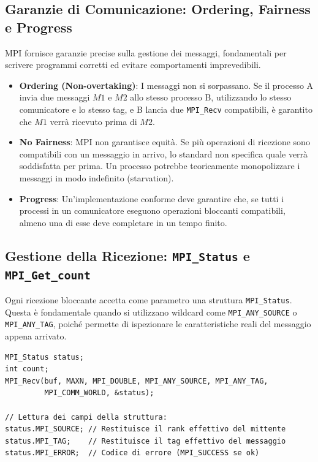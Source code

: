 \subsection{Garanzie di Comunicazione: Ordering, Fairness e Progress}
MPI fornisce garanzie precise sulla gestione dei messaggi, fondamentali per scrivere programmi corretti ed evitare comportamenti imprevedibili.

\begin{itemize}
    \item \textbf{Ordering (Non-overtaking)}: I messaggi non si sorpassano. Se il processo A invia due messaggi $M1$ e $M2$ allo stesso processo B, utilizzando lo stesso comunicatore e lo stesso tag, e B lancia due \texttt{MPI\_Recv} compatibili, è garantito che $M1$ verrà ricevuto prima di $M2$.
    \item \textbf{No Fairness}: MPI non garantisce equità. Se più operazioni di ricezione sono compatibili con un messaggio in arrivo, lo standard non specifica quale verrà soddisfatta per prima. Un processo potrebbe teoricamente monopolizzare i messaggi in modo indefinito (starvation).
    \item \textbf{Progress}: Un'implementazione conforme deve garantire che, se tutti i processi in un comunicatore eseguono operazioni bloccanti compatibili, almeno una di esse deve completare in un tempo finito.
\end{itemize}

\subsection{Gestione della Ricezione: \texttt{MPI\_Status} e \texttt{MPI\_Get\_count}}
Ogni ricezione bloccante accetta come parametro una struttura \texttt{MPI\_Status}. Questa è fondamentale quando si utilizzano wildcard come \texttt{MPI\_ANY\_SOURCE} o \texttt{MPI\_ANY\_TAG}, poiché permette di ispezionare le caratteristiche reali del messaggio appena arrivato.

\begin{verbatim}
MPI_Status status;
int count;
MPI_Recv(buf, MAXN, MPI_DOUBLE, MPI_ANY_SOURCE, MPI_ANY_TAG, 
         MPI_COMM_WORLD, &status);

// Lettura dei campi della struttura:
status.MPI_SOURCE; // Restituisce il rank effettivo del mittente
status.MPI_TAG;    // Restituisce il tag effettivo del messaggio
status.MPI_ERROR;  // Codice di errore (MPI_SUCCESS se ok)
\end{verbatim}

